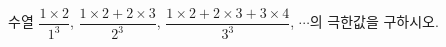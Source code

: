 수열 $\dfrac{1\times 2}{1^3}$, $\dfrac{1\times 2+2\times 3}{2^3}$, $\dfrac{1\times 2+2\times 3+3\times 4}{3^3}$, $\cdots$의 극한값을 구하시오.
